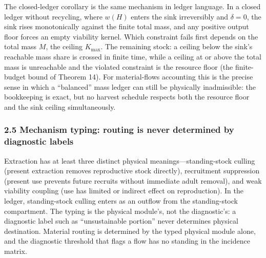 \documentclass[11pt]{article}
\begin{document}
The closed-ledger corollary is the same mechanism in ledger language. In a closed ledger without recycling, where \(w(H)\) enters the sink irreversibly and \(\delta = 0\), the sink rises monotonically against the finite total mass, and any positive output floor forces an empty viability kernel. Which constraint fails first depends on the total mass \(M\), the ceiling \(K_{\max}\). The remaining stock: a ceiling below the sink's reachable mass share is crossed in finite time, while a ceiling at or above the total mass is unreachable and the violated constraint is the resource floor (the finite-budget bound of Theorem 14). For material-flows accounting this is the precise sense in which a ``balanced'' mass ledger can still be physically inadmissible: the bookkeeping is exact, but no harvest schedule respects both the resource floor and the sink ceiling simultaneously.

\subsubsection{2.5 Mechanism typing: routing is never determined by
diagnostic
labels}\label{mechanism-typing-routing-is-never-determined-by-diagnostic-labels}

Extraction has at least three distinct physical meanings---standing-stock culling (present extraction removes reproductive stock
directly), recruitment suppression (present use prevents future recruits
without immediate adult removal), and weak viability coupling (use has
limited or indirect effect on reproduction). In the ledger,
standing-stock culling enters as an outflow from the standing-stock
compartment. The typing is the physical module's, not the diagnostic's:
a diagnostic label such as ``unsustainable portion'' never determines
physical destination. Material routing is determined by the typed
physical module alone, and the diagnostic threshold that flags a flow
has no standing in the incidence matrix.
\end{document}

